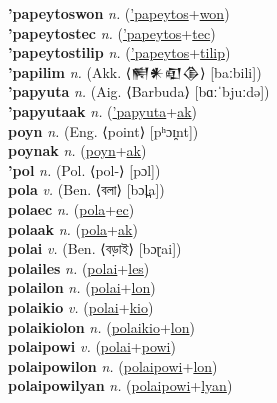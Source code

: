 \textbf{'papeytoswon} \textit{n.} (\hyperref['papeytos]{'papeytos}+\hyperref[won]{won})
 \label{'papeytoswon} \\
\textbf{'papeytostec} \textit{n.} (\hyperref['papeytos]{'papeytos}+\hyperref[tec]{tec})
 \label{'papeytostec} \\
\textbf{'papeytostilip} \textit{n.} (\hyperref['papeytos]{'papeytos}+\hyperref[tilip]{tilip})
 \label{'papeytostilip} \\
\textbf{'papilim} \textit{n.} (Akk. ⟨𒆍𒀭𒊏𒆠⟩ [baːbili])
 \label{'papilim} \\
\textbf{'papyuta} \textit{n.} (Aig. ⟨Barbuda⟩ [bɑːˈbjuːdə])
 \label{'papyuta} \\
\textbf{'papyutaak} \textit{n.} (\hyperref['papyuta]{'papyuta}+\hyperref[ak]{ak})
 \label{'papyutaak} \\
\textbf{poyn} \textit{n.} (Eng. ⟨point⟩ [pʰɔɪ̯nt])
 \label{poyn} \\
\textbf{poynak} \textit{n.} (\hyperref[poyn]{poyn}+\hyperref[ak]{ak})
 \label{poynak} \\
\textbf{'pol} \textit{n.} (Pol. ⟨pol-⟩ [pɔl])
 \label{'pol} \\
\textbf{pola} \textit{v.} (Ben. ⟨বলা⟩ [bɔl̪a])
 \label{pola} \\
\textbf{polaec} \textit{n.} (\hyperref[pola]{pola}+\hyperref[ec]{ec})
 \label{polaec} \\
\textbf{polaak} \textit{n.} (\hyperref[pola]{pola}+\hyperref[ak]{ak})
 \label{polaak} \\
\textbf{polai} \textit{v.} (Ben. ⟨বড়াই⟩ [bɔɽai])
 \label{polai} \\
\textbf{polailes} \textit{n.} (\hyperref[polai]{polai}+\hyperref[les]{les})
 \label{polailes} \\
\textbf{polailon} \textit{n.} (\hyperref[polai]{polai}+\hyperref[lon]{lon})
 \label{polailon} \\
\textbf{polaikio} \textit{v.} (\hyperref[polai]{polai}+\hyperref[kio]{kio})
 \label{polaikio} \\
\textbf{polaikiolon} \textit{n.} (\hyperref[polaikio]{polaikio}+\hyperref[lon]{lon})
 \label{polaikiolon} \\
\textbf{polaipowi} \textit{v.} (\hyperref[polai]{polai}+\hyperref[powi]{powi})
 \label{polaipowi} \\
\textbf{polaipowilon} \textit{n.} (\hyperref[polaipowi]{polaipowi}+\hyperref[lon]{lon})
 \label{polaipowilon} \\
\textbf{polaipowilyan} \textit{n.} (\hyperref[polaipowi]{polaipowi}+\hyperref[lyan]{lyan})
